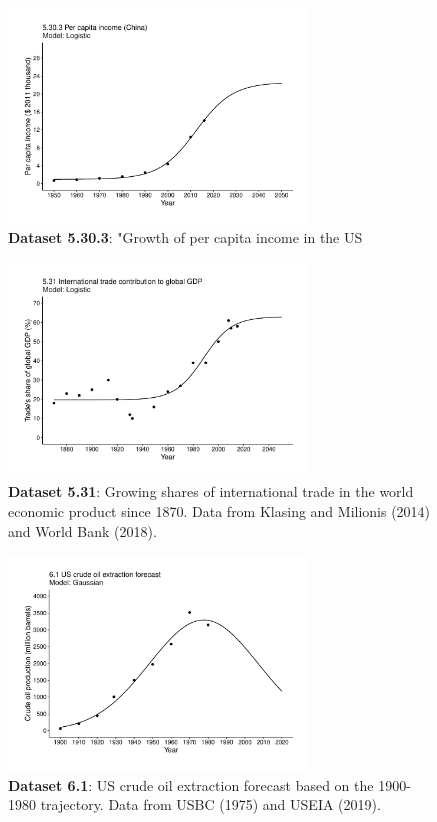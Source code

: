 \documentclass[aps,rmp,preprint,superscriptaddress,10pt,onecolumn]{article}
\begin{document}
\begin{figure}[h]
\includegraphics[width=8cm]{output/figs-ggplot/5.30.3.pdf}
\caption{\textbf{Dataset 5.30.3}: "Growth of per capita income in the US}
\end{figure}
	
\begin{figure}[h]
\includegraphics[width=8cm]{output/figs-ggplot/5.31.pdf}
\caption{\textbf{Dataset 5.31}: Growing shares of international trade in the world economic product since 1870. Data from Klasing and Milionis (2014) and World Bank (2018).}
\end{figure}
	
\begin{figure}[h]
\includegraphics[width=8cm]{output/figs-ggplot/6.1.pdf}
\caption{\textbf{Dataset 6.1}: US crude oil extraction forecast based on the 1900-1980 trajectory. Data from USBC (1975) and USEIA (2019). }
\end{figure}
	
\end{document}
